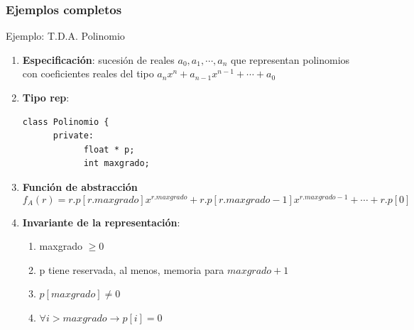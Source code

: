 \documentclass[10pt,a4paper,spanish]{report}
\begin{document}
\subsubsection{\textcolor[rgb]{0.8,0.2,0.2}Ejemplos completos}
\noindent
Ejemplo: T.D.A. Polinomio
\begin{enumerate}[$\heartsuit$]
\item \textbf{\textcolor[rgb]{0.8,0.2,0.2}{Especificación}}: sucesión de reales ${a_{0}, a_{1},\cdots,a_{n}}$ que representan polinomios con coeficientes reales del tipo $a_{n}x^{n}+a_{n-1}x^{n-1}+\cdots+a_{0}$

\item \textbf{\textcolor[rgb]{0.8,0.2,0.2}{Tipo rep}}:
\begin{verbatim}
class Polinomio {
      private:
            float * p;
            int maxgrado;
\end{verbatim}

\item \textbf{\textcolor[rgb]{0.8,0.2,0.2}Función de abstracción}
\begin{displaymath}
f_{A}(r) = r.p[r.maxgrado]x^{r.maxgrado} + r.p[r.maxgrado-1]x^{r.maxgrado-1} + \cdots + r.p[0]
\end{displaymath}

\item \textbf{\textcolor[rgb]{0.8,0.2,0.2}{Invariante de la representación}}:
\begin{enumerate}[---]
\item maxgrado $\geq 0$
\item p tiene reservada, al menos, memoria para $maxgrado+1$
\item $p[maxgrado] \neq 0$
\item $\forall i > maxgrado \longrightarrow p[i]=0$
\end{enumerate}
\end{enumerate}
\end{document}
